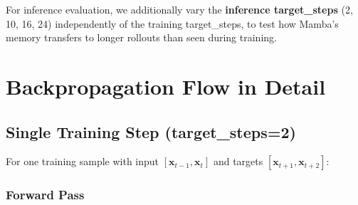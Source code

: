 \documentclass[11pt,a4paper]{article}
\begin{document}
For inference evaluation, we additionally vary the \textbf{inference target\_steps} (2, 10, 16, 24) independently of the training target\_steps, to test how Mamba's memory transfers to longer rollouts than seen during training.

\section{Backpropagation Flow in Detail}

\subsection{Single Training Step (target\_steps=2)}

For one training sample with input $[\mathbf{x}_{t-1}, \mathbf{x}_t]$ and targets $[\mathbf{x}_{t+1}, \mathbf{x}_{t+2}]$:

\subsubsection{Forward Pass}
\end{document}
